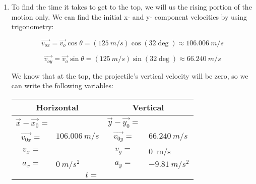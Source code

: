 {\begin{mdframed}[backgroundcolor=blue!10!white]
\begin{center}

\end{center}



\begin{enumerate}
	\item To find the time it takes to get to the top, we will us the rising portion of the motion only.  We can find the initial x- and y- component velocities by using trigonometry:
	
		\begin{equation*}
		\overrightarrow{v_{ox}} = \overrightarrow{v_o} \cos \theta = (\SI{125}{m/s}) \cos(32\deg) \approx \SI{106.006}{m/s}
	\end{equation*}
	
	\begin{equation*}
		\overrightarrow{v_{oy}} = \overrightarrow{v_o} \sin \theta = (\SI{125}{m/s}) \sin(32 \deg) \approx \SI{66.240}{m/s}	
	\end{equation*}
	
	
	
	
	
	We know that at the top, the projectile's vertical velocity will be zero, so we can write the following variables:
	
		
	\begin{longtable}{|c l | c l|}
		\hline
		\multicolumn{2}{|c|}{\textbf{Horizontal}} & \multicolumn{2}{|c|}{\textbf{ Vertical}} \\
		\hline
		$\vec{x}-\vec{x_0}$ =&     & $\vec{y}-\vec{y_0} = $ &   \\
		\hline
		$\vec{v_{0x}} = $ & $\SI{106.006}{m/s}$ & $\vec{v_{0y}} = $ & $\SI{66.240}{m/s}$ \\
		\hline
		$v_x = $&  & $v_y = $ & \SI{0}{m/s} \\
		\hline
		$a_x = $ & $\SI{0}{m/s^2}$ & $a_y = $ & $\SI{-9.81}{m/s^2}$ \\ 
		\hline
		\multicolumn{2}{|r}{$t = $} & \multicolumn{2}{l|}{  }  \\
		\hline
	\end{longtable}
	

\end{enumerate}
\end{mdframed}}
